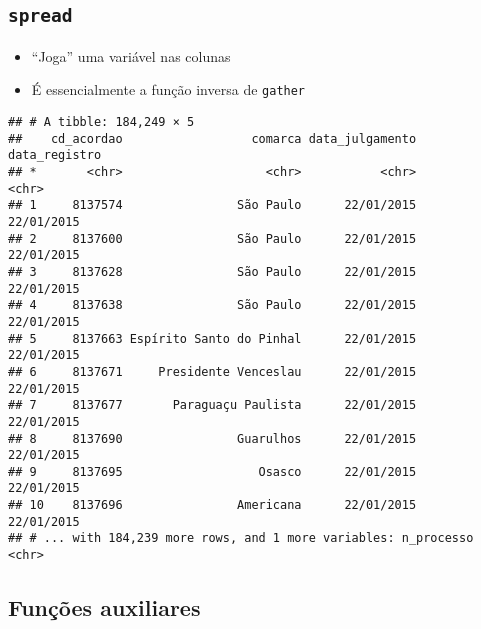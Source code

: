 \documentclass[]{book}
\newenvironment{Shaded}{\begin{snugshade}}{\end{snugshade}}
\newcommand{\KeywordTok}[1]{\textcolor[rgb]{0.13,0.29,0.53}{\textbf{{#1}}}}
\newcommand{\DataTypeTok}[1]{\textcolor[rgb]{0.13,0.29,0.53}{{#1}}}
\newcommand{\StringTok}[1]{\textcolor[rgb]{0.31,0.60,0.02}{{#1}}}
\newcommand{\OtherTok}[1]{\textcolor[rgb]{0.56,0.35,0.01}{{#1}}}
\newcommand{\NormalTok}[1]{{#1}}
\providecommand{\tightlist}{%
  \setlength{\itemsep}{0pt}\setlength{\parskip}{0pt}}
\begin{document}
\subsection{\texorpdfstring{\texttt{spread}}{spread}}\label{spread}

\begin{itemize}
\tightlist
\item
  ``Joga'' uma variável nas colunas
\item
  É essencialmente a função inversa de \texttt{gather}
\end{itemize}

\begin{Shaded}
\end{Shaded}

\begin{verbatim}
## # A tibble: 184,249 × 5
##    cd_acordao                  comarca data_julgamento data_registro
## *       <chr>                    <chr>           <chr>         <chr>
## 1     8137574                São Paulo      22/01/2015    22/01/2015
## 2     8137600                São Paulo      22/01/2015    22/01/2015
## 3     8137628                São Paulo      22/01/2015    22/01/2015
## 4     8137638                São Paulo      22/01/2015    22/01/2015
## 5     8137663 Espírito Santo do Pinhal      22/01/2015    22/01/2015
## 6     8137671     Presidente Venceslau      22/01/2015    22/01/2015
## 7     8137677       Paraguaçu Paulista      22/01/2015    22/01/2015
## 8     8137690                Guarulhos      22/01/2015    22/01/2015
## 9     8137695                   Osasco      22/01/2015    22/01/2015
## 10    8137696                Americana      22/01/2015    22/01/2015
## # ... with 184,239 more rows, and 1 more variables: n_processo <chr>
\end{verbatim}

\subsection{Funções auxiliares}\label{funcoes-auxiliares}
\end{document}
